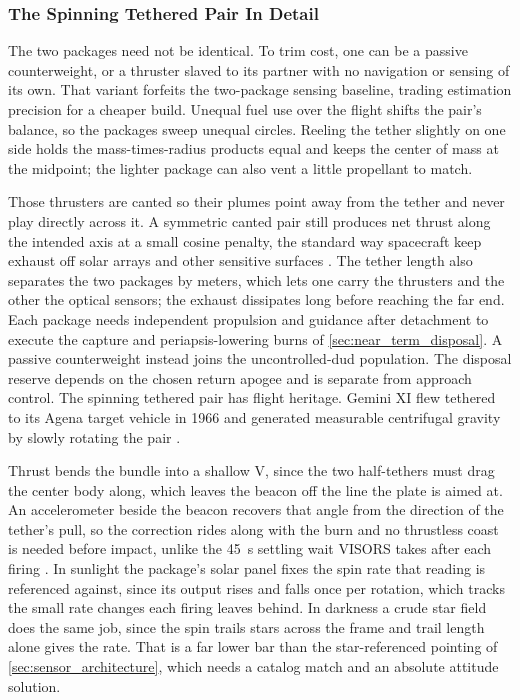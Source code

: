 \documentclass{article}
\begin{document}
\subsubsection{The Spinning Tethered Pair In Detail}\label{sec:spinning_tension_detail}

The two packages need not be identical. To trim cost, one can be a passive counterweight, or a thruster slaved to its partner with no navigation or sensing of its own. That variant forfeits the two-package sensing baseline, trading estimation precision for a cheaper build. Unequal fuel use over the flight shifts the pair's balance, so the packages sweep unequal circles. Reeling the tether slightly on one side holds the mass-times-radius products equal and keeps the center of mass at the midpoint; the lighter package can also vent a little propellant to match.

Those thrusters are canted so their plumes point away from the tether and never play directly across it. A symmetric canted pair still produces net thrust along the intended axis at a small cosine penalty, the standard way spacecraft keep exhaust off solar arrays and other sensitive surfaces \cite{dettleff_plume}. The tether length also separates the two packages by meters, which lets one carry the thrusters and the other the optical sensors; the exhaust dissipates long before reaching the far end. Each package needs independent propulsion and guidance after detachment to execute the capture and periapsis-lowering burns of \autoref{sec:near_term_disposal}. A passive counterweight instead joins the uncontrolled-dud population. The disposal reserve depends on the chosen return apogee and is separate from approach control. The spinning tethered pair has flight heritage. Gemini XI flew tethered to its Agena target vehicle in 1966 and generated measurable centrifugal gravity by slowly rotating the pair \cite{gemini11_tether}.

Thrust bends the bundle into a shallow V, since the two half-tethers must drag the center body along, which leaves the beacon off the line the plate is aimed at. An accelerometer beside the beacon recovers that angle from the direction of the tether's pull, so the correction rides along with the burn and no thrustless coast is needed before impact, unlike the \SI{45}{\second} settling wait VISORS takes after each firing \cite{guffanti2023autonomous}. In sunlight the package's solar panel fixes the spin rate that reading is referenced against, since its output rises and falls once per rotation, which tracks the small rate changes each firing leaves behind. In darkness a crude star field does the same job, since the spin trails stars across the frame and trail length alone gives the rate. That is a far lower bar than the star-referenced pointing of \autoref{sec:sensor_architecture}, which needs a catalog match and an absolute attitude solution.
\end{document}
